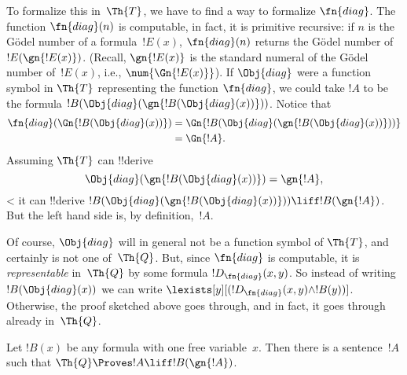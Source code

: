 \documentclass[../../../include/open-logic-section]{subfiles}
\begin{document}
\begin{explain}
To formalize this in~$\Th{T}$, we have to find a way to formalize
$\fn{diag}$. The function $\fn{diag}(n)$ is computable, in fact, it is
primitive recursive: if $n$ is the G\"odel number of a
formula~$!E(x)$, $\fn{diag}(n)$ returns the G\"odel number
of~$!E(\gn{!E(x)})$. (Recall, $\gn{!E(x)}$ is the standard numeral of
the G\"odel number of~$!E(x)$, i.e., $\num{\Gn{!E(x)}}$). If
$\Obj{diag}$ were a function symbol in $\Th{T}$ representing the
function $\fn{diag}$, we could take $!A$ to be the formula
$!B(\Obj{diag}(\gn{!B(\Obj{diag}(x))}))$. Notice that
\begin{align*}
\fn{diag}(\Gn{!B(\Obj{diag}(x))}) & = 
\Gn{!B(\Obj{diag}(\gn{!B(\Obj{diag}(x))}))} \\
& = \Gn{!A}.
\end{align*}
Assuming $\Th{T}$ can !!{derive}
\[
\Obj{diag}(\gn{!B(\Obj{diag}(x))}) = \gn{!A},
\]<
it can !!{derive} $!B(\Obj{diag}(\gn{!B(\Obj{diag}(x))}))
\liff !B(\gn{!A})$. But the left hand side is, by
definition,~$!A$.

Of course, $\Obj{diag}$ will in general not be a function symbol of
$\Th{T}$, and certainly is not one of~$\Th{Q}$. But, since $\fn{diag}$
is computable, it is \emph{representable} in~$\Th{Q}$ by some formula
$!D_{\fn{diag}}(x,y)$. So instead of writing $!B(\Obj{diag}(x))$ we
can write $\lexists[y][(!D_{\fn{diag}}(x,y) \land !B(y))]$. Otherwise,
the proof sketched above goes through, and in fact, it goes through
already in~$\Th{Q}$.
\end{explain}

\begin{lem}
 Let $!B(x)$ be any formula with one free
variable~$x$. Then there is a sentence~$!A$ such that $\Th{Q} \Proves
!A \liff !B(\gn{!A})$.
\end{lem}
\end{document}
